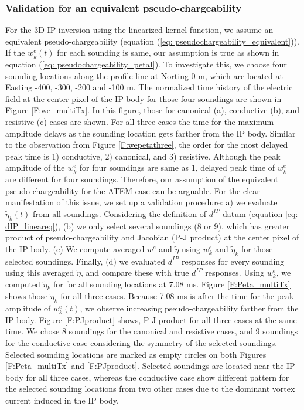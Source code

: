 \documentclass[a4paper, 11pt]{article}
\newcommand{\peta}{\tilde{\eta}}
\newcommand{\dip}{d^{IP}}
\begin{document}
\subsubsection{Validation for an equivalent pseudo-chargeability}
For the 3D IP inversion using the linearized kernel function, we assume an equivalent pseudo-chargeability (equation (\ref{eq: pseudochargeability_equivalent})). If the $w^e_k(t)$ for each sounding is same, our assumption is true as shown in equation (\ref{eq: pseudochargeability_petaI}). 
To investigate this, we choose four sounding locations along the profile line at Norting 0 m, which are located at Easting -400, -300, -200 and -100 m. The normalized time history of the electric field at the center pixel of the IP body for those four soundings are shown in Figure \ref{F:we_multiTx}. 
In this figure, those for canonical (a), conductive (b), and resistive (c) cases are shown. For all three cases the time for the maximum amplitude delays as the sounding location gets farther from the IP body. Similar to the observation from Figure \ref{F:wepetathree}, the order for the most delayed peak time is 1) conductive, 2) canonical, and 3) resistive. Although the peak amplitude of the $w^e_k$ for four soundings are same as 1, delayed peak time of $w^e_k$ are different for four soundings. 
Therefore, our assumption of the equivalent pseudo-chargeability for the ATEM case can be arguable. For the clear manifestation of this issue, we set up a validation procedure: a) we evaluate $\peta_k(t)$ from all soundings. 
Considering the definition of $\dip$ datum (equation \ref{eq: dIP_lineareq}), (b) we only select several soundings (8 or 9), which has greater product of pseudo-chargeability and Jacobian (P-J product) at the center pixel of the IP body. 
(c) We compute averaged $w^e$ and $\peta$ using $w^e_k$ and $\peta_k$ for those selected soundings. 
Finally, (d) we evaluated $\dip$ responses for every sounding using this averaged $\peta$, and compare these with true $\dip$ responses. 
Using $w^e_k$, we computed $\peta_k$ for for all sounding locations at 7.08 ms. Figure \ref{F:Peta_multiTx} shows those $\peta_k$ for all three cases. Because 7.08 ms is after the time for the peak amplitude of $w^e_k(t)$, we observe increasing pseudo-chargeability farther from the IP body.
Figure \ref{F:PJproduct} shows, P-J product for all three cases at the same time. We chose 8 soundings for the canonical and resistive cases, and 9 soundings for the conductive case considering the symmetry of the selected soundings. Selected sounding locations are marked as empty circles on both Figures \ref{F:Peta_multiTx} and \ref{F:PJproduct}. Selected soundings are located near the IP body for all three cases, whereas the conductive case show different pattern for the selected sounding locations from two other cases due to the dominant vortex current induced in the IP body.  
\end{document}
